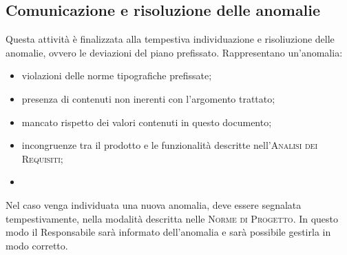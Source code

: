 \subsection{Comunicazione e risoluzione delle anomalie}

Questa attività è finalizzata alla tempestiva individuazione e risoliuzione delle anomalie, ovvero le deviazioni del piano prefissato. Rappresentano un'anomalia:
\begin{itemize}
    \item violazioni delle norme tipografiche prefissate;
    \item presenza di contenuti non inerenti con l'argomento trattato;
    \item mancato rispetto dei valori contenuti in questo documento;
    \item incongruenze tra il prodotto e le funzionalità descritte nell'\textsc{Analisi dei Requisiti};
    \item 
\end{itemize}
Nel caso venga individuata una nuova anomalia, deve essere segnalata tempestivamente, nella modalità descritta nelle \textsc{Norme di Progetto}. In questo modo il Responsabile sarà informato dell'anomalia e sarà possibile gestirla in modo corretto.

